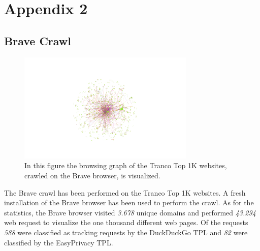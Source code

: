 \chapter{Appendix 2}
\section{Brave Crawl}
\begin{figure}[ht!]
\begin{center}
\includegraphics[width=0.75\textwidth]{images/brave.png}
\end{center}
\caption{In this figure the browsing graph of the Tranco Top 1K websites, crawled on the Brave browser, is visualized. }
\end{figure}
The Brave crawl has been performed on the Tranco Top 1K websites. A fresh installation of the Brave browser has been used to perform
the crawl. As for the statistics, the Brave browser visited \emph{3.678} unique domains and performed \emph{43.294} web request to 
visualize the one thousand different web pages. Of the requests \emph{588} were classified as tracking requests by the DuckDuckGo 
TPL and \emph{82} were classified by the EasyPrivacy TPL.

